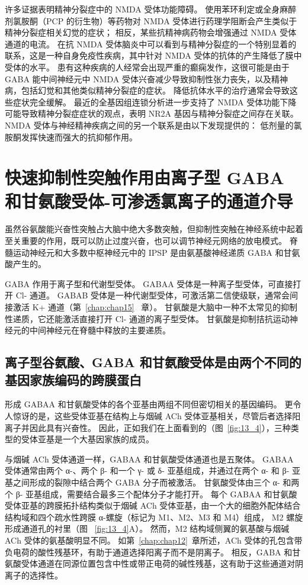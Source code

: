 许多证据表明精神分裂症中的 NMDA 受体功能障碍。
使用苯环利定或全身麻醉剂氯胺酮（PCP 的衍生物）等药物对 NMDA 受体进行药理学阻断会产生类似于精神分裂症相关幻觉的症状；
相反，某些抗精神病药物会增强通过 NMDA 受体通道的电流。
在抗 NMDA 受体脑炎中可以看到与精神分裂症的一个特别显着的联系，这是一种自身免疫性疾病，其中针对 NMDA 受体的抗体的产生降低了膜中受体的水平。
患有这种疾病的人经常会出现严重的癫痫发作，这很可能是由于 GABA 能中间神经元中 NMDA 受体兴奋减少导致抑制性张力丧失，以及精神病，包括幻觉和其他类似精神分裂症的症状。
降低抗体水平的治疗通常会导致这些症状完全缓解。
最近的全基因组连锁分析进一步支持了 NMDA 受体功能下降可能导致精神分裂症症状的观点，表明 NR2A 基因与精神分裂症之间存在关联。
NMDA 受体与神经精神疾病之间的另一个联系是由以下发现提供的：
低剂量的氯胺酮发挥快速而强大的抗抑郁作用。



\section{快速抑制性突触作用由离子型 GABA 和甘氨酸受体-可渗透氯离子的通道介导}

虽然谷氨酸能兴奋性突触占大脑中绝大多数突触，但抑制性突触在神经系统中起着至关重要的作用，既可以防止过度兴奋，也可以调节神经元网络的放电模式。
脊髓运动神经元和大多数中枢神经元中的 IPSP 是由氨基酸神经递质 GABA 和甘氨酸产生的。


GABA 作用于离子型和代谢型受体。 GABAA 受体是一种离子型受体，可直接打开 Cl- 通道。
GABAB 受体是一种代谢型受体，可激活第二信使级联，通常会间接激活 K+ 通道（第~\ref{chap:chap15} ~章）。 
甘氨酸是大脑中一种不太常见的抑制性递质，它还能激活直接打开 Cl- 通道的离子型受体。
甘氨酸是抑制拮抗运动神经元的中间神经元在脊髓中释放的主要递质。



\subsection{离子型谷氨酸、GABA 和甘氨酸受体是由两个不同的基因家族编码的跨膜蛋白}

形成 GABAA 和甘氨酸受体的各个亚基由两组不同但密切相关的基因编码。
更令人惊讶的是，这些受体亚基在结构上与烟碱 ACh 受体亚基相关，尽管后者选择阳离子并因此具有兴奋性。 
因此，正如我们在上面看到的（图~\ref{fig:13_4}），三种类型的受体亚基是一个大基因家族的成员。


与烟碱 ACh 受体通道一样，GABAA 和甘氨酸受体通道也是五聚体。
GABAA 受体通常由两个 α-、两个 β- 和一个 γ- 或 δ- 亚基组成，并通过在两个 α- 和 β- 亚基之间形成的裂隙中结合两个 GABA 分子而被激活。
甘氨酸受体由三个 α- 和两个 β- 亚基组成，需要结合最多三个配体分子才能打开。
每个 GABAA 和甘氨酸受体亚基的跨膜拓扑结构类似于烟碱 ACh 受体亚基，由一个大的细胞外配体结合结构域和四个疏水性跨膜 α-螺旋（标记为 M1、M2、M3 和 M4）组成， M2 螺旋形成通道孔的衬里（图 ~\ref{fig:13_4}A）。
然而，M2 结构域侧翼的氨基酸与烟碱 ACh 受体的氨基酸明显不同。
如第~\ref{chap:chap12}~章所述，ACh 受体的孔包含带负电荷的酸性残基环，有助于通道选择阳离子而不是阴离子。
相反，GABA 和甘氨酸受体通道在同源位置包含中性或带正电荷的碱性残基，这有助于这些通道对阴离子的选择性。


